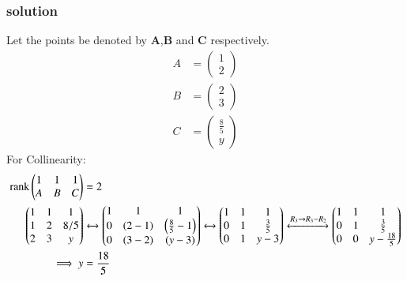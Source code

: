 \documentclass[journal,12pt,onecolumn]{IEEEtran}
\theoremstyle{remark}
\begin{document}
\subsubsection{solution}
Let the points be denoted by $\textbf{A}$,$\textbf{B}$ and $\textbf{C}$ respectively.
\begin{align}
  A &= \begin{pmatrix}
        1\\
        2
    \end{pmatrix}  \\
    B &= \begin{pmatrix}
        2\\
        3
    \end{pmatrix}\\
  C &= \begin{pmatrix}
        \frac{8}{5}\\
        y
    \end{pmatrix}
    \end{align}
    For Collinearity:
    \begin{align}
          \text{rank}\begin{pmatrix}
        1 & 1 & 1\\
        A & B & C
    \end{pmatrix} &=2 \label{10}\\
    \begin{pmatrix}
        1 & 1 & 1\\
        1 & 2 & 8/5\\
        2 & 3 & y
    \end{pmatrix} &\xleftrightarrow{}
    \begin{pmatrix}
        1 & 1 & 1\\
        0 & \left(2-1\right) & \left(\frac{8}{5}-1\right)\\
        0 & \left(3-2\right) & \left(y-3\right)
    \end{pmatrix}\xleftrightarrow{}
    \begin{pmatrix}
        1 & 1 & 1\\
        0 & 1 & \frac{3}{5}\\
        0 & 1 & y-3
    \end{pmatrix}\xleftrightarrow{R_3\rightarrow R_3-R_2}
    \begin{pmatrix}
        1 & 1 & 1\\
        0 & 1 & \frac{3}{5}\\
        0 & 0 & y-\frac{18}{5}
    \end{pmatrix}\\
    \implies y &= \frac{18}{5}
\end{align}
\end{document}
